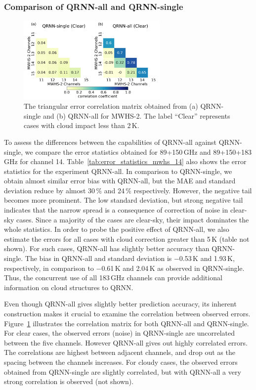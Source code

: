 \documentclass[amt, manuscript]{copernicus}
\begin{document}
\subsubsection{Comparison of QRNN-all and QRNN-single}
%
\begin{figure}[t]
	\centering
	\includegraphics[width=0.65\textwidth]{Figures/fig04.pdf} 
	\caption{ The triangular error correlation matrix obtained from (a) QRNN-single and (b) QRNN-all for MWHS-2. The label ``Clear'' represents cases with cloud impact less than 2\,K.}
	\label{fig:correlations_mwhs}	
\end{figure}
To assess the differences between the capabilities of QRNN-all against QRNN-single, we  compare the error statistics obtained for 89+150\,GHz and 89+150+183\,GHz for channel 14.  Table~\ref{tab:error_statistics_mwhs_14} also shows the error statistics for the experiment QRNN-all. In comparison to QRNN-single, we obtain almost similar error bias with QRNN-all, but the MAE and standard deviation reduce by almost 30\,\% and 24\,\% respectively. However, the negative tail becomes more prominent. The low standard deviation, but strong negative tail indicates that the narrow spread is a consequence of correction of noise in clear-sky cases. Since a majority of the cases are clear-sky, their impact dominates the whole statistics. In order to probe the positive effect of QRNN-all, we also estimate the errors for all cases with cloud correction greater than 5\,K (table not shown). For such cases,  QRNN-all has slightly better accuracy than QRNN-single. The bias in QRNN-all and standard deviation is $-$0.53\,K and 1.93\,K, respectively, in comparison to $-$0.61\,K and 2.04\,K as observed in QRNN-single. Thus, the concurrent use of all 183\,GHz channels can provide additional information on cloud structures to QRNN. 

Even though QRNN-all gives slightly better prediction accuracy, its inherent construction makes it crucial to examine the correlation between observed errors. Figure~\ref{fig:correlations_mwhs} illustrates the correlation matrix for both QRNN-all and QRNN-single. For clear cases, the observed errors (noise) in QRNN-single are uncorrelated between the five channels. However QRNN-all gives out highly correlated errors. The correlations are highest between adjacent channels, and drop out as the spacing between the channels increases. For cloudy cases, the observed errors obtained from QRNN-single are slightly correlated, but with QRNN-all a very strong correlation is observed (not shown). 
\end{document}
